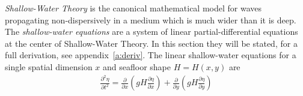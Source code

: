 \documentclass[../main.tex]{subfiles}
\begin{document}
\textit{Shallow-Water Theory} is the canonical mathematical model for waves propagating non-dispersively in a medium which is much wider than it is deep. The \textit{shallow-water equations} are a system of linear partial-differential equations at the center of Shallow-Water Theory. In this section they will be stated, for a full derivation, see appendix~\ref{a:deriv}. The linear shallow-water equations for a single spatial dimension $x$ and  seafloor shape $H=H(x,y)$ are
\begin{gather}\label{eq:shallow}
    \frac{\partial^2 \eta}{\partial t^2} = \frac{\partial}{\partial x}\left( gH\frac{\partial \eta}{\partial x} \right) + \frac{\partial}{\partial y}\left( gH\frac{\partial \eta}{\partial y} \right)
\end{gather}
\end{document}
